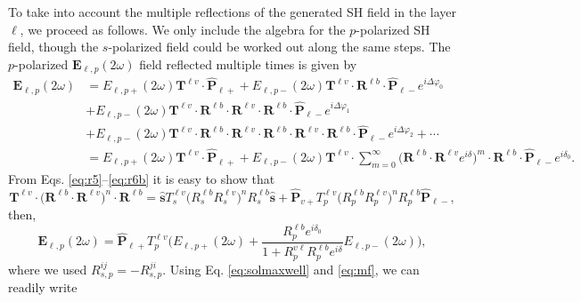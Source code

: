 \documentclass[aps,pra,10pt,amsmath,notitlepage,letterpaper]{revtex4-1}
\begin{document}
To take into account the multiple reflections of the generated SH field in the
layer $\ell$, we proceed as follows. We only include the algebra for the
$p$-polarized SH field, though the $s$-polarized field could be worked out along
the same steps. The $p$-polarized $\mathbf{E}_{\ell,p}(2\omega)$ field reflected
multiple times is given by
\begin{equation}\label{eq:E2wcomplete}
\begin{split}
\mathbf{E}_{\ell,p}(2\omega) 
&= E_{\ell,p+}(2\omega)\mathbf{T}^{\ell v}\cdot\hat{\mathbf{P}}_{\ell +}
 + E_{\ell,p-}(2\omega)\mathbf{T}^{\ell v}
\cdot\mathbf{R}^{\ell b}\cdot\hat{\mathbf{P}}_{\ell-}e^{i\Delta\varphi_{0}}\\
&+ E_{\ell,p-}(2\omega)\mathbf{T}^{\ell v}
\cdot\mathbf{R}^{\ell b}\cdot\mathbf{R}^{\ell v}
\cdot\mathbf{R}^{\ell b}\cdot\hat{\mathbf{P}}_{\ell-}e^{i\Delta\varphi_{1}}
\\
&+ E_{\ell,p-}(2\omega)\mathbf{T}^{\ell v}
\cdot\mathbf{R}^{\ell b}\cdot\mathbf{R}^{\ell v}
\cdot\mathbf{R}^{\ell b}\cdot\mathbf{R}^{\ell v}
\cdot\mathbf{R}^{\ell b}\cdot\hat{\mathbf{P}}_{\ell-}e^{i\Delta\varphi_{2}}
+\cdots\\
&= E_{\ell,p+}(2\omega)\mathbf{T}^{\ell v}\cdot\hat{\mathbf{P}}_{\ell +}
+ E_{\ell,p-}(2\omega) \mathbf{T}^{\ell v}
\cdot\sum_{m=0}^\infty  
\big(
\mathbf{R}^{\ell b}\cdot\mathbf{R}^{\ell v} 
e^{i\delta}\Big)^m 
\cdot\mathbf{R}^{\ell b}\cdot\hat{\mathbf{P}}_{\ell-}e^{i\delta_{0}}.
\end{split}
\end{equation}
From Eqs. \eqref{eq:r5}--\eqref{eq:r6b} it is easy to show that
\begin{equation*}\label{eq:m1}
\mathbf{T}^{\ell v}\cdot
\Big(\mathbf{R}^{\ell b}\cdot\mathbf{R}^{\ell v}\Big)^{n}\cdot
\mathbf{R}^{\ell b}
= \hat{\mathbf{s}}T^{\ell v}_{s}
  \Big(R^{\ell b}_{s}R^{\ell v}_{s}\Big)^{n}R^{\ell b}_{s}\hat{\mathbf{s}}
+ \hat{\mathbf{P}}_{v+}T^{\ell v}_{p}\Big(R^{\ell b}_{p}R^{\ell v}_{p}\Big)^n 
  R^{\ell b}_{p} 
\hat{\mathbf{P}}_{\ell-},
\end{equation*}
then,
\begin{equation}\label{eq:E2wreduced}
\mathbf{E}_{\ell,p}(2\omega) 
= \hat{\mathbf{P}}_{\ell +}T^{\ell v}_{p}
\Big(
E_{\ell,p+}(2\omega) +
\frac{R^{\ell b}_{p}e^{i\delta_{0}}}{1 + R^{v\ell}_{p}R^{\ell b}_{p}e^{i\delta}}
E_{\ell,p-}(2\omega) 
\Big),
\end{equation}
where we used $R^{ij}_{s,p} = -R^{ji}_{s,p}$. Using Eq. \eqref{eq:solmaxwell}
and \eqref{eq:mf}, we can readily write
\end{document}
